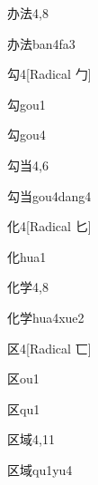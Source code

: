 \begin{entry}{办法}{4,8}
  \begin{phonetics}{办法}{ban4fa3}
  \end{phonetics}
\end{entry}

\begin{entry}{勾}{4}[Radical ⼓]
  \begin{phonetics}{勾}{gou1}
  \end{phonetics}
  \begin{phonetics}{勾}{gou4}
  \end{phonetics}
\end{entry}

\begin{entry}{勾当}{4,6}
  \begin{phonetics}{勾当}{gou4dang4}
  \end{phonetics}
\end{entry}

\begin{entry}{化}{4}[Radical 匕]
  \begin{phonetics}{化}{hua1}
  \end{phonetics}
\end{entry}

\begin{entry}{化学}{4,8}
  \begin{phonetics}{化学}{hua4xue2}
  \end{phonetics}
\end{entry}

\begin{entry}{区}{4}[Radical 匸]
  \begin{phonetics}{区}{ou1}
  \end{phonetics}
  \begin{phonetics}{区}{qu1}
  \end{phonetics}
\end{entry}

\begin{entry}{区域}{4,11}
  \begin{phonetics}{区域}{qu1yu4}
  \end{phonetics}
\end{entry}

